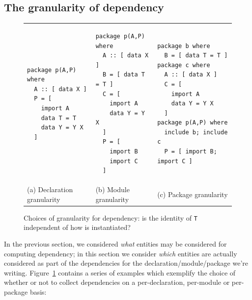 \documentclass{article}
\begin{document}
\subsection{The granularity of dependency}

\begin{savenotes}
\begin{figure}
    \begin{tabular}{C C C}
\begin{verbatim}
package p(A,P) where
  A :: [ data X ]
  P = [
    import A
    data T = T
    data Y = Y X
  ]
\end{verbatim}
&
\begin{verbatim}
package p(A,P) where
  A :: [ data X ]
  B = [ data T = T ]
  C = [
    import A
    data Y = Y X
  ]
  P = [
    import B
    import C
  ]
\end{verbatim}
&
\begin{verbatim}
package b where
  B = [ data T = T ]
package c where
  A :: [ data X ]
  C = [
    import A
    data Y = Y X
  ]
package p(A,P) where
  include b; include c
  P = [ import B; import C ]
\end{verbatim}
  \\
  (a) Declaration granularity  &
  (b) Module granularity  &
  (c) Package granularity  \\
\end{tabular}
\caption{Choices of granularity for dependency: is the identity of \texttt{T} independent of how  is instantiated?}\label{fig:granularity}
\end{figure}

\end{savenotes}

In the previous section, we considered \emph{what} entities may be considered for
computing dependency; in this section we consider \emph{which} entities are actually
considered as part of the dependencies for the declaration/module/package we're writing.
Figure~\ref{fig:granularity} contains a series of examples which exemplify the choice
of whether or not to collect dependencies on a per-declaration, per-module or per-package basis:
\end{document}
